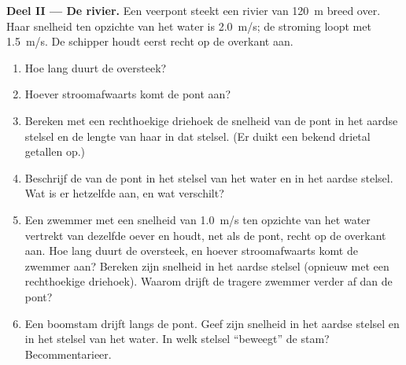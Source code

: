 \begin{problem}
\medskip
\noindent\textbf{Deel II --- De rivier.}
Een veerpont steekt een rivier van \qty{120}{m} breed over. Haar snelheid
ten opzichte van het water is \qty{2.0}{m/s}; de stroming loopt met
\qty{1.5}{m/s}. De schipper houdt eerst recht op de overkant aan.
\begin{enumerate}[resume]
  \item Hoe lang duurt de oversteek?
  \item Hoever stroomafwaarts komt de pont aan?
  \item Bereken met een rechthoekige driehoek de snelheid van de pont in
        het aardse stelsel en de lengte van haar  in dat stelsel.
        (Er duikt een bekend drietal getallen op.)
  \item Beschrijf de  van de pont in het stelsel van het water en in
        het aardse stelsel. Wat is er hetzelfde aan, en wat verschilt?
  \item Een zwemmer met een snelheid van \qty{1.0}{m/s} ten opzichte van
        het water vertrekt van dezelfde oever en houdt, net als de pont,
        recht op de overkant aan. Hoe lang duurt de oversteek, en hoever
        stroomafwaarts komt de zwemmer aan? Bereken zijn snelheid in het
        aardse stelsel (opnieuw met een rechthoekige driehoek). Waarom
        drijft de tragere zwemmer verder af dan de pont?
  \item Een boomstam drijft langs de pont. Geef zijn snelheid in het
        aardse stelsel en in het stelsel van het water. In welk stelsel
        ``beweegt'' de stam? Becommentarieer.
\end{enumerate}


\end{problem}
